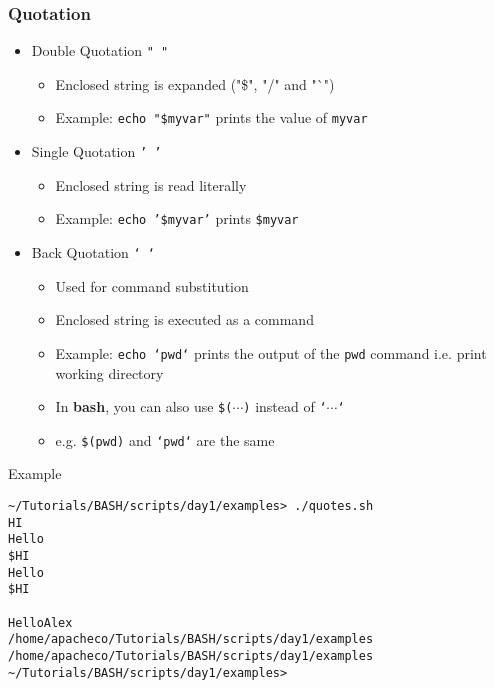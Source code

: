 \documentclass[10pt,t]{beamer}
\begin{document}
\begin{frame}
  \frametitle{Quotation}
  \begin{itemize}
    \item Double Quotation \texttt{" "}
    \begin{itemize}
        \item Enclosed string is expanded ("\$", "/" and "`")
        \item Example: \texttt{echo "\$myvar"} prints the value of \texttt{myvar}
    \end{itemize}
    \item Single Quotation \texttt{' '}
    \begin{itemize}
        \item Enclosed string is read literally
        \item Example: \texttt{echo '\$myvar'} prints \texttt{\$myvar}
    \end{itemize}
    \item Back Quotation \texttt{` `}
    \begin{itemize}
        \item Used for command substitution
        \item Enclosed string is executed as a command
        \item Example: \texttt{echo `pwd`} prints the output of the \texttt{pwd} command i.e. print working directory
        \item In \textbf{bash}, you can also use \texttt{\$($\cdots$)} instead of \texttt{`$\cdots$`}
        \item[] e.g. \texttt{\$(pwd)} and \texttt{`pwd`} are the same
    \end{itemize}
  \end{itemize}
\end{frame}

\begin{frame}[fragile]{Example}
  
  \begin{lstlisting}[basicstyle=\tiny\ttfamily,style=LINUX]
~/Tutorials/BASH/scripts/day1/examples> ./quotes.sh 
HI
Hello
$HI
Hello
$HI

HelloAlex
/home/apacheco/Tutorials/BASH/scripts/day1/examples
/home/apacheco/Tutorials/BASH/scripts/day1/examples
~/Tutorials/BASH/scripts/day1/examples>
  \end{lstlisting}
\end{frame}
\end{document}

